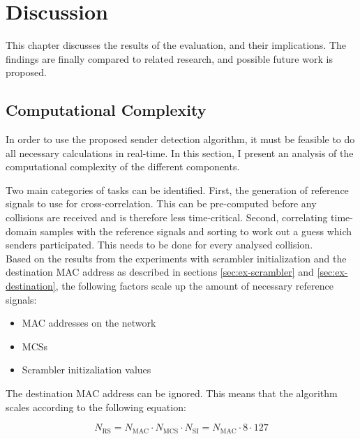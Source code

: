 
\chapter{Discussion}\label{ch:Discussion}
\glsresetall %

This chapter discusses the results of the evaluation, and their implications. The findings are finally compared to related research, and possible future work is proposed.



\section{Computational Complexity}\label{sec:complexity}

In order to use the proposed sender detection algorithm, it must be feasible to do all necessary calculations in real-time. In this section, I present an analysis of the computational complexity of the different components.

Two main categories of tasks can be identified. First, the generation of reference signals to use for cross-correlation. This can be pre-computed before any collisions are received and is therefore less time-critical. Second, correlating time-domain samples with the reference signals and sorting to work out a guess which senders participated. This needs to be done for every analysed collision.\\

Based on the results from the experiments with scrambler initialization and the destination MAC address as described in sections \ref{sec:ex-scrambler} and \ref{sec:ex-destination}, the following factors scale up the amount of necessary reference signals:

\begin{itemize}
  \item MAC addresses on the network
  \item \glspl{MCS}
  \item Scrambler initizaliation values
\end{itemize}

The destination MAC address can be ignored. This means that the algorithm scales according to the following equation:

$$ N_{\text{RS}} = N_{\text{MAC}} \cdot N_{\text{MCS}} \cdot N_{\text{SI}} = N_{\text{MAC}} \cdot 8 \cdot 127 $$\vspace{0cm}

